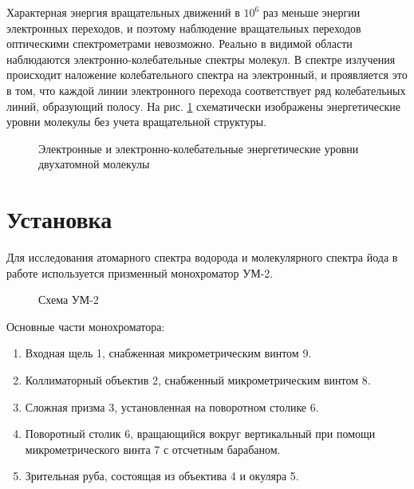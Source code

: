 \documentclass[a4paper,12pt]{article}
\begin{document}
	Характерная энергия вращательных движений в $10^6$ раз меньше энергии электронных переходов, и поэтому наблюдение вращательных переходов оптическими спектрометрами невозможно. Реально в видимой области наблюдаются электронно-колебательные спектры молекул. В спектре излучения происходит наложение колебательного спектра на электронный, и проявляется это в том, что каждой линии электронного перехода соответствует ряд колебательных линий, образующий полосу. На рис. \ref{levels} схематически изображены энергетические уровни молекулы без учета вращательной структуры.
	
	
	\begin{figure}[ht!]\label{levels} 
		\caption{Электронные и электронно-колебательные энергетические уровни двухатомной молекулы}
	\end{figure}
	
	
	\section{Установка}
	Для исследования атомарного спектра водорода и молекулярного спектра йода в работе используется призменный монохроматор УМ-2.
	
	\begin{figure}[ht!]\label{monochrome} 
		\caption{Схема УМ-2}
	\end{figure}
	
	Основные части монохроматора:
	\begin{enumerate}
		\item Входная щель 1, снабженная микрометрическим винтом 9.
		\item Коллиматорный объектив 2, снабженный микрометрическим винтом 8.
		\item Сложная призма 3, установленная на поворотном столике 6.
		\item Поворотный столик 6, вращающийся вокруг вертикальный при помощи микрометрического винта 7 с отсчетным барабаном.
		\item Зрительная руба, состоящая из объектива 4 и окуляра 5.
	\end{enumerate}
	
\end{document}
